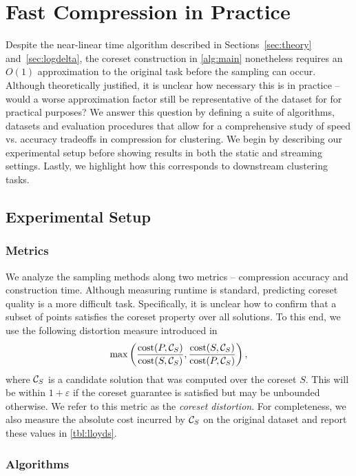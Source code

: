\section{Fast Compression in Practice}

Despite the near-linear time algorithm described in Sections~\ref{sec:theory} and~\ref{sec:logdelta}, the coreset construction in \ref{alg:main} nonetheless
requires an $O(1)$ approximation to the original task before the sampling can occur. Although theoretically justified, it is unclear how necessary this is in
practice -- would a worse approximation factor still be representative of the dataset for for practical purposes? We answer this question by defining a suite of
algorithms, datasets and evaluation procedures that allow for a comprehensive study of speed vs. accuracy tradeoffs in compression for clustering.  We begin by
describing our experimental setup before showing results in both the static and streaming settings.  Lastly, we highlight how this corresponds to downstream
clustering tasks.

\subsection{Experimental Setup}
\subsubsection{Metrics}
\label{sssec:metrics}

We analyze the sampling methods along two metrics -- compression accuracy and construction time. Although measuring runtime is standard, predicting coreset
quality is a more difficult task. Specifically, it is unclear how to confirm that a subset of points satisfies the coreset property over all solutions. To this
end, we use the following distortion measure introduced in~\cite{chrisESA} \[ \max \left( \dfrac{\operatorname{cost}(P, \mathcal C_{S})}{\operatorname{cost}(S, \mathcal C_{S})}, \dfrac{\operatorname{cost}(S,
\mathcal C_{S})}{\operatorname{cost}(P, \mathcal C_{S})} \right),\] where $\mathcal C_{S}$ is a candidate solution that was computed over the coreset $S$. This
will be within $1+\varepsilon$ if the coreset guarantee is satisfied but may be unbounded otherwise.  We refer to this metric as the \emph{coreset distortion}.
For completeness, we also measure the absolute cost incurred by $\mathcal C_S$ on the original dataset and report these values in \cref{tbl:lloyds}.

\subsubsection{Algorithms}
\label{ssec:algorithms}

